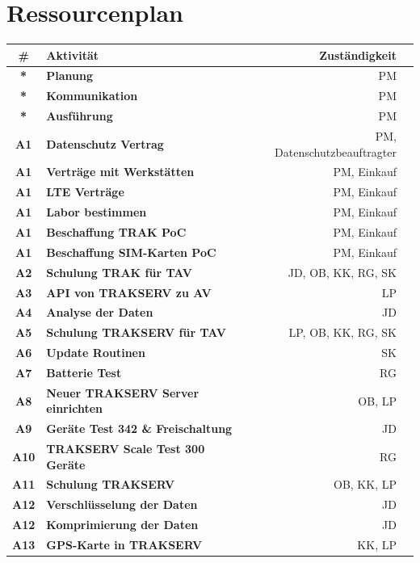 \documentclass[a4paper,10pt]{scrartcl}
\begin{document}
\section{Ressourcenplan}

\begin{tabular}{clrr} 
\toprule
\textbf{\#} & \textbf{Aktivität} & \textbf{Zuständigkeit} \\ 
\midrule 
\midrule
\textbf{*} &\textbf{Planung} 							& PM\\
\textbf{*} &\textbf{Kommunikation} 						& PM\\
\textbf{*} &\textbf{Ausführung} 						& PM\\
\textbf{A1} &\textbf{Datenschutz Vertrag} 				& PM, Datenschutzbeauftragter\\
\textbf{A1} &\textbf{Verträge mit Werkstätten} 			& PM, Einkauf\\
\textbf{A1} &\textbf{LTE Verträge} 						& PM, Einkauf\\
\textbf{A1} &\textbf{Labor bestimmen} 					& PM, Einkauf\\
\textbf{A1} &\textbf{Beschaffung TRAK PoC}				& PM, Einkauf\\
\textbf{A1} &\textbf{Beschaffung SIM-Karten PoC} 		& PM, Einkauf\\
\textbf{A2} &\textbf{Schulung TRAK für TAV} 			& JD, OB, KK, RG, SK\\
\textbf{A3} &\textbf{API von TRAKSERV zu AV} 	& LP\\
\textbf{A4} &\textbf{Analyse der Daten} 				& JD\\
\textbf{A5} &\textbf{Schulung TRAKSERV für TAV} 		& LP, OB, KK, RG, SK\\
\textbf{A6} &\textbf{Update Routinen} 					& SK\\
\textbf{A7} &\textbf{Batterie Test} 					& RG \\
\textbf{A8} &\textbf{Neuer TRAKSERV Server einrichten} 	& OB, LP\\
\textbf{A9} &\textbf{Geräte Test 342 \& Freischaltung} 	& JD\\
\textbf{A10} &\textbf{TRAKSERV Scale Test 300 Geräte}	& RG\\
\textbf{A11} &\textbf{Schulung TRAKSERV} 				& OB, KK, LP\\
\textbf{A12} &\textbf{Verschlüsselung der Daten} 		& JD\\
\textbf{A12} &\textbf{Komprimierung der Daten} 			& JD\\
\textbf{A13} &\textbf{GPS-Karte in TRAKSERV} 			& KK, LP\\

\end{tabular}
\end{document}
